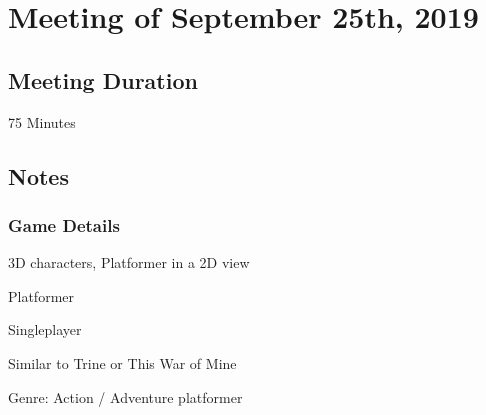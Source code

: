 \documentclass{article}
\begin{document}
  \begin{figure}[!htb]
  \end{figure}











\section{Meeting of September 25th, 2019}

\subsection{Meeting Duration}
75 Minutes

\subsection{Notes}
\subsubsection{Game Details}
\begin{description}
\item 3D characters, Platformer in a 2D view
\item Platformer
\item Singleplayer
\item Similar to Trine or This War of Mine
\item Genre: Action / Adventure platformer
\end{description}
\end{document}
